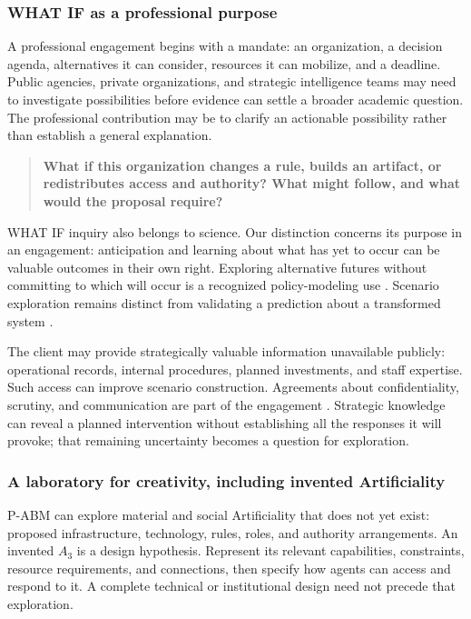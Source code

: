 \documentclass[11pt,a4paper]{article}
\begin{document}
\subsubsection{WHAT IF as a professional purpose}

A professional engagement begins with a mandate: an organization, a decision agenda, alternatives it can consider, resources it can mobilize, and a deadline. Public agencies, private organizations, and strategic intelligence teams may need to investigate possibilities before evidence can settle a broader academic question. The professional contribution may be to clarify an actionable possibility rather than establish a general explanation.

\begin{quote}
\textbf{What if this organization changes a rule, builds an artifact, or redistributes access and authority? What might follow, and what would the proposal require?}
\end{quote}

WHAT IF inquiry also belongs to science. Our distinction concerns its purpose in an engagement: anticipation and learning about what has yet to occur can be valuable outcomes in their own right. Exploring alternative futures without committing to which will occur is a recognized policy-modeling use \cite[paras.~2.5, 3.8--3.11]{gilbert_policy_2018}. Scenario exploration remains distinct from validating a prediction about a transformed system \cite[paras.~3.4, 3.10]{polhill_prediction_2021}.

The client may provide strategically valuable information unavailable publicly: operational records, internal procedures, planned investments, and staff expertise. Such access can improve scenario construction. Agreements about confidentiality, scrutiny, and communication are part of the engagement \cite[paras.~5.32, 6.3]{gilbert_policy_2018}. Strategic knowledge can reveal a planned intervention without establishing all the responses it will provoke; that remaining uncertainty becomes a question for exploration.

\subsubsection{A laboratory for creativity, including invented Artificiality}

P-ABM can explore material and social Artificiality that does not yet exist: proposed infrastructure, technology, rules, roles, and authority arrangements. An invented $A_3$ is a design hypothesis. Represent its relevant capabilities, constraints, resource requirements, and connections, then specify how agents can access and respond to it. A complete technical or institutional design need not precede that exploration.
\end{document}
